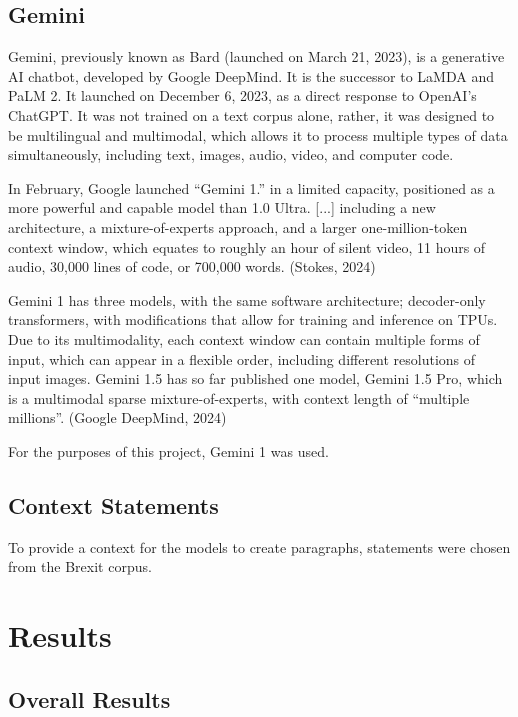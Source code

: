 \documentclass[fleqn,moreauthors,10pt]{ds_report}
\begin{document}
\subsection*{Gemini}

Gemini, previously known as Bard (launched on March 21, 2023), is a generative AI chatbot, developed by Google DeepMind. It is the successor to LaMDA and PaLM 2. It launched on December 6, 2023, as a direct response to OpenAI’s ChatGPT. It was not trained on a text corpus alone, rather, it was designed to be multilingual and multimodal, which allows it to process multiple types of data simultaneously, including text, images, audio, video, and computer code.

In February, Google launched “Gemini 1.” in a limited capacity, positioned as a more powerful and capable model than 1.0 Ultra. [...] including a new architecture, a mixture-of-experts approach, and a larger one-million-token context window, which equates to roughly an hour of silent video, 11 hours of audio, 30,000 lines of code, or 700,000 words. (Stokes, 2024)

Gemini 1 has three models, with the same software architecture; decoder-only transformers, with modifications that allow for training and inference on TPUs. Due to its multimodality, each context window can contain multiple forms of input, which can appear in a flexible order, including different resolutions of input images. Gemini 1.5 has so far published one model, Gemini 1.5 Pro, which is a multimodal sparse mixture-of-experts, with context length of “multiple millions”.  (Google DeepMind, 2024)

For the purposes of this project, Gemini 1 was used.

\subsection*{Context Statements}

To provide a context for the models to create paragraphs, statements were chosen from the Brexit corpus.


\section*{Results}

\subsection*{Overall Results}
\end{document}

